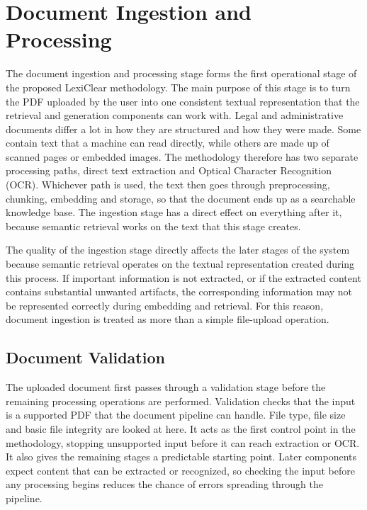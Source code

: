 \documentclass[12pt,a4paper,oneside]{report}
\begin{document}
\section{Document Ingestion and Processing}

The document ingestion and processing stage forms the first operational stage
of the proposed LexiClear methodology. The main purpose of this stage is to turn the PDF uploaded by the user into one consistent textual representation that the retrieval and generation components can work with. Legal and administrative documents differ a lot in how they are structured and how they were made. Some contain text that a machine can read directly, while others are made up of scanned pages or embedded images. The methodology therefore has two separate processing paths, direct text extraction and Optical Character Recognition (OCR). Whichever path is used, the text then goes through preprocessing, chunking, embedding and storage, so that the document ends up as a searchable knowledge base. The ingestion stage has a direct effect on everything after it, because semantic retrieval works on the text that this stage creates.

The quality of the ingestion stage directly affects the later stages of the
system because semantic retrieval operates on the textual representation
created during this process. If important information is not extracted, or
if the extracted content contains substantial unwanted artifacts, the
corresponding information may not be represented correctly during embedding
and retrieval. For this reason, document ingestion is treated as more than a
simple file-upload operation. 

\subsection{Document Validation}

The uploaded document first passes through a validation stage before the
remaining processing operations are performed. Validation checks that the input is a supported PDF that the document pipeline can handle. File type, file size and basic file integrity are looked at here. It acts as the first control point in the methodology, stopping unsupported input before it can reach extraction or OCR. It also gives the remaining stages a predictable starting point. Later components expect content that can be extracted or recognized, so checking the input before any processing begins reduces the chance of errors spreading through the pipeline.
\end{document}
